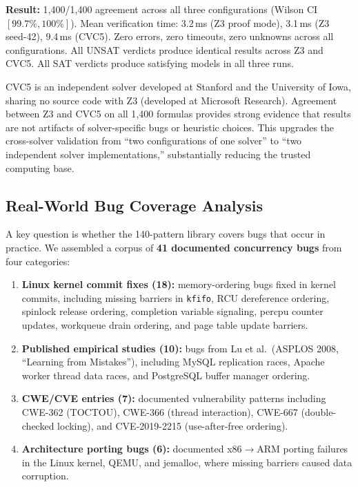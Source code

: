 \documentclass[11pt]{article}
\begin{document}
\noindent
\textbf{Result:} 1{,}400/1{,}400 agreement across all three configurations
(Wilson CI $[99.7\%, 100\%]$).
Mean verification time: 3.2\,ms (Z3 proof mode), 3.1\,ms (Z3 seed-42),
9.4\,ms (CVC5).
Zero errors, zero timeouts, zero unknowns across all configurations.
All UNSAT verdicts produce identical results across Z3 and CVC5.
All SAT verdicts produce satisfying models in all three runs.

CVC5 is an independent solver developed at Stanford and the
University of Iowa, sharing no source code with Z3 (developed at
Microsoft Research).  Agreement between Z3 and CVC5 on all 1{,}400
formulas provides strong evidence that results are not artifacts of
solver-specific bugs or heuristic choices.  This upgrades the
cross-solver validation from ``two configurations of one solver''
to ``two independent solver implementations,'' substantially
reducing the trusted computing base.

\subsection{Real-World Bug Coverage Analysis}
\label{sec:bug-coverage}

A key question is whether the 140-pattern library covers bugs that
occur in practice.  We assembled a corpus of \textbf{41 documented
concurrency bugs} from four categories:

\begin{enumerate}[nosep]
\item \textbf{Linux kernel commit fixes (18):} memory-ordering bugs
  fixed in kernel commits, including missing barriers in
  \texttt{kfifo}, RCU dereference ordering, spinlock release
  ordering, completion variable signaling, percpu counter updates,
  workqueue drain ordering, and page table update barriers.
\item \textbf{Published empirical studies (10):} bugs from
  Lu et al.~(ASPLOS 2008, ``Learning from Mistakes''),
  including MySQL replication races, Apache worker thread
  data races, and PostgreSQL buffer manager ordering.
\item \textbf{CWE/CVE entries (7):} documented vulnerability
  patterns including CWE-362 (TOCTOU), CWE-366 (thread
  interaction), CWE-667 (double-checked locking), and
  CVE-2019-2215 (use-after-free ordering).
\item \textbf{Architecture porting bugs (6):} documented x86$\to$ARM
  porting failures in the Linux kernel, QEMU, and jemalloc,
  where missing barriers caused data corruption.
\end{enumerate}
\end{document}
